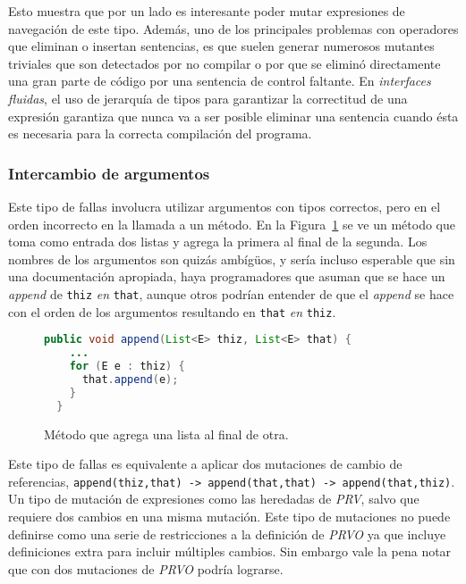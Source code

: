 Esto muestra que por un lado es interesante poder mutar expresiones de navegaci\'on de este tipo. Adem\'as, uno de los principales problemas con operadores que eliminan o insertan sentencias, es que suelen generar numerosos mutantes triviales que son detectados por no compilar o por que se elimin\'o directamente una gran parte de c\'odigo por una sentencia de control faltante. En \emph{interfaces fluidas}, el uso de jerarqu\'ia de tipos para garantizar la correctitud de una expresi\'on garantiza que nunca va a ser posible eliminar una sentencia cuando \'esta es necesaria para la correcta compilaci\'on del programa.

\subsubsection{Intercambio de argumentos}

Este tipo de fallas involucra utilizar argumentos con tipos correctos, pero en el orden incorrecto en la llamada a un m\'etodo. En la Figura~\ref{figures.examples.argumentSwap.example1} se ve un m\'etodo que toma como entrada dos listas y agrega la primera al final de la segunda. Los nombres de los argumentos son quiz\'as amb\'ig\"{u}os, y ser\'ia incluso esperable que sin una documentaci\'on apropiada, haya programadores que asuman que se hace un \emph{append} de \texttt{thiz} \emph{en} \texttt{that}, aunque otros podr\'ian entender de que el \emph{append} se hace con el orden de los argumentos resultando en \texttt{that} \emph{en} \texttt{thiz}. 

\begin{figure}
	\begin{lstlisting}[frame=single, mathescape=true,xleftmargin=0.012\textwidth,xrightmargin=0.012\textwidth,language=Java,basicstyle={}]
  public void append(List<E> thiz, List<E> that) {
    ...
    for (E e : thiz) {
      that.append(e);
    }
  }
	\end{lstlisting}
	\caption[M\'etodo de ejemplo \emph{append(List<E>, List<E>)}]{M\'etodo que agrega una lista al final de otra.}
	\label{figures.examples.argumentSwap.example1}
\end{figure}

Este tipo de fallas es equivalente a aplicar dos mutaciones de cambio de referencias, \lstinline|append(thiz,that) -> append(that,that) -> append(that,thiz)|. Un tipo de mutaci\'on de expresiones como las heredadas de \emph{PRV}, salvo que requiere dos cambios en una misma mutaci\'on. Este tipo de mutaciones no puede definirse como una serie de restricciones a la definici\'on de \emph{PRVO} ya que incluye definiciones extra para incluir m\'ultiples cambios. Sin embargo vale la pena notar que con dos mutaciones de \emph{PRVO} podr\'ia lograrse.

